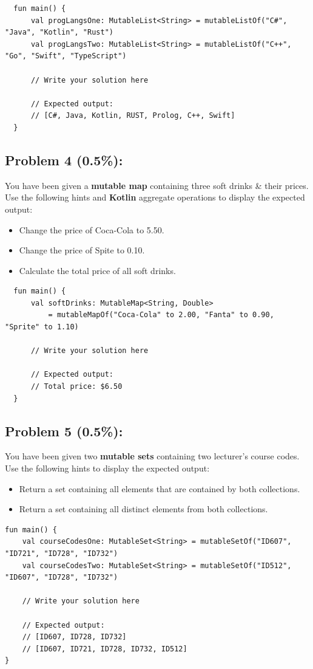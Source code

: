 \documentclass{article}
\begin{document}
\begin{verbatim}
  fun main() {
      val progLangsOne: MutableList<String> = mutableListOf("C#", "Java", "Kotlin", "Rust")
      val progLangsTwo: MutableList<String> = mutableListOf("C++", "Go", "Swift", "TypeScript")
    
      // Write your solution here
    
      // Expected output:
      // [C#, Java, Kotlin, RUST, Prolog, C++, Swift]
  }
\end{verbatim}

\subsection*{Problem 4 (0.5\%):} You have been given a \textbf{mutable map} containing three soft drinks \& their prices. Use the following hints and \textbf{Kotlin} aggregate operations to display the expected output:
\begin{itemize}
  \item Change the price of Coca-Cola to 5.50.
  \item Change the price of Spite to 0.10.
  \item Calculate the total price of all soft drinks.
\end{itemize}

\begin{verbatim}
  fun main() {
      val softDrinks: MutableMap<String, Double> 
          = mutableMapOf("Coca-Cola" to 2.00, "Fanta" to 0.90, "Sprite" to 1.10)

      // Write your solution here
			
      // Expected output:
      // Total price: $6.50
  }
\end{verbatim}

\subsection*{Problem 5 (0.5\%):} You have been given two \textbf{mutable sets} containing two lecturer's course codes. Use the following hints to display the expected output:
\begin{itemize}
  \item Return a set containing all elements that are contained by both collections.
  \item Return a set containing all distinct elements from both collections.
\end{itemize}

\begin{verbatim}
fun main() {
    val courseCodesOne: MutableSet<String> = mutableSetOf("ID607", "ID721", "ID728", "ID732")
    val courseCodesTwo: MutableSet<String> = mutableSetOf("ID512", "ID607", "ID728", "ID732")
    
    // Write your solution here
    
    // Expected output:
    // [ID607, ID728, ID732]
    // [ID607, ID721, ID728, ID732, ID512] 
}
\end{verbatim}
\end{document}
